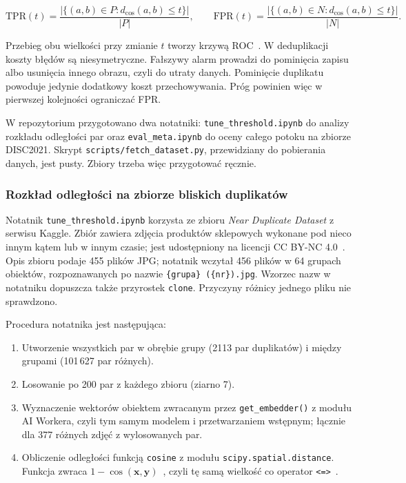 \begin{equation}
\label{eq:tpr-fpr}
\mathrm{TPR}(t)=\frac{\left|\{(a,b)\in P: d_{\cos}(a,b)\leq t\}\right|}{|P|},
\qquad
\mathrm{FPR}(t)=\frac{\left|\{(a,b)\in N: d_{\cos}(a,b)\leq t\}\right|}{|N|}.
\end{equation}

Przebieg obu wielkości przy zmianie \(t\) tworzy krzywą
ROC~\cite{fawcett2006roc}. W deduplikacji koszty błędów są
niesymetryczne. Fałszywy alarm prowadzi do pominięcia zapisu albo
usunięcia innego obrazu, czyli do utraty danych. Pominięcie duplikatu
powoduje jedynie dodatkowy koszt przechowywania. Próg powinien więc
w pierwszej kolejności ograniczać FPR.

W repozytorium przygotowano dwa notatniki: \texttt{tune\_threshold.ipynb}
do analizy rozkładu odległości par oraz \texttt{eval\_meta.ipynb}
do oceny całego potoku na zbiorze DISC2021. Skrypt
\texttt{scripts/fetch\_dataset.py}, przewidziany do pobierania danych,
jest pusty. Zbiory trzeba więc przygotować ręcznie.

\subsubsection{Rozkład odległości na zbiorze bliskich duplikatów}

Notatnik \texttt{tune\_threshold.ipynb} korzysta ze zbioru
\textit{Near Duplicate Dataset} z serwisu Kaggle. Zbiór zawiera zdjęcia
produktów sklepowych wykonane pod nieco innym kątem lub
w innym czasie; jest udostępniony na licencji CC BY-NC
4.0~\cite{kaggle_crystal0801}. Opis zbioru podaje 455 plików JPG;
notatnik wczytał 456 plików w 64 grupach obiektów, rozpoznawanych
po nazwie \texttt{\{grupa\} (\{nr\}).jpg}. Wzorzec nazw w notatniku dopuszcza także
przyrostek \texttt{clone}. Przyczyny różnicy jednego pliku
nie sprawdzono.

Procedura notatnika jest następująca:

\begin{enumerate}
    \item Utworzenie wszystkich par w obrębie grupy (2113 par
    duplikatów) i między grupami (101\,627 par różnych).
    \item Losowanie po 200 par z każdego zbioru (ziarno 7).
    \item Wyznaczenie wektorów obiektem zwracanym przez
    \texttt{get\_embedder()} z modułu AI Workera, czyli tym samym
    modelem i przetwarzaniem wstępnym; łącznie dla 377 różnych zdjęć z wylosowanych par.
    \item Obliczenie odległości funkcją \texttt{cosine} z modułu
    \texttt{scipy.\allowbreak spatial.\allowbreak distance}. Funkcja zwraca
    \(1-\cos(\mathbf{x},\mathbf{y})\)~\cite{scipy_cosine}, czyli tę samą
    wielkość co operator \texttt{<=>}~\cite{pgvector_docs}.
\end{enumerate}

